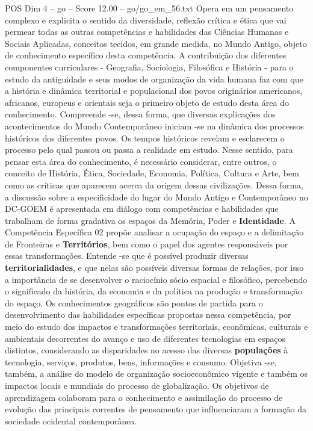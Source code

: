 \begin{textsample}{POS Dim 4 – go – Score 12.00 – go/go\_em\_56.txt}
Opera em um pensamento complexo e explicita o sentido da diversidade, reflexão crítica e ética que vai permear todas as outras competências e habilidades das Ciências Humanas e Sociais Aplicadas, conceitos tecidos, em grande medida, no Mundo Antigo, objeto de conhecimento específico desta competência.
A contribuição dos diferentes componentes curriculares - Geografia, Sociologia, Filosófica e História - para o estudo da antiguidade e seus modos de organização da vida humana faz com que a história e dinâmica territorial e populacional dos povos originários americanos, africanos, europeus e orientais seja o primeiro objeto de estudo desta área do conhecimento.
Compreende -se, dessa forma, que diversas explicações dos acontecimentos do Mundo Contemporâneo iniciam -se na dinâmica dos processos históricos dos diferentes povos.
Os tempos históricos revelam e esclarecem o processo pelo qual passou ou passa a realidade em estudo.
Nesse sentido, para pensar esta área do conhecimento, é necessário considerar, entre outros, o conceito de História, Ética, Sociedade, Economia, Política, Cultura e Arte, bem como as críticas que aparecem acerca da origem dessas civilizações.
Dessa forma, a discussão sobre a especificidade do lugar do Mundo Antigo e Contemporâneo no DC-GOEM é apresentada em diálogo com competências e habilidades que trabalham de forma gradativa os espaços da Memória, Poder e \textbf{Identidade}.
A Competência Específica 02 propõe analisar a ocupação do espaço e a delimitação de Fronteiras e \textbf{Territórios}, bem como o papel dos agentes responsáveis por essas transformações.
Entende -se que é possível produzir diversas \textbf{territorialidades}, e que nelas são possíveis diversas formas de relações, por isso a importância de se desenvolver o raciocínio sócio espacial e filosófico, percebendo o significado da história, da economia e da política na produção e transformação do espaço.
Os conhecimentos geográficos são pontos de partida para o desenvolvimento das habilidades específicas propostas nessa competência, por meio do estudo dos impactos e transformações territoriais, econômicas, culturais e ambientais decorrentes do avanço e uso de diferentes tecnologias em espaços distintos, considerando as disparidades no acesso das diversas \textbf{populações} à tecnologia, serviços, produtos, bens, informações e consumo.
Objetiva -se, também, a análise do modelo de organização socioeconômico vigente e também os impactos locais e mundiais do processo de globalização.
Os objetivos de aprendizagem colaboram para o conhecimento e assimilação do processo de evolução das principais correntes de pensamento que influenciaram a formação da sociedade ocidental contemporânea.

\end{textsample}

